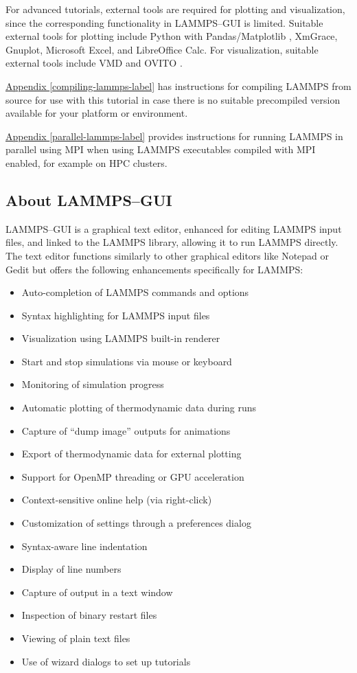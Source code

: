 \documentclass[9pt,tutorial]{livecoms}
\begin{document}
For advanced tutorials, external tools are required for plotting and
visualization, since the corresponding functionality in LAMMPS--GUI is
limited.  Suitable external tools for plotting include Python with
Pandas/Matplotlib \cite{van1995python,hunter2007Matplotlib}, XmGrace,
Gnuplot, Microsoft Excel, and LibreOffice Calc.  For
visualization, suitable external tools include VMD \cite{vmd_home,humphrey1996vmd}
and OVITO \cite{ovito_home,ovito_paper}.

\hyperref[compiling-lammps-label]{Appendix \ref{compiling-lammps-label}}
has instructions for compiling LAMMPS from source for use with this
tutorial in case there is no suitable precompiled version available
for your platform or environment.

\hyperref[parallel-lammps-label]{Appendix \ref{parallel-lammps-label}}
provides instructions for running LAMMPS in parallel using MPI when
using LAMMPS executables compiled with MPI enabled, for example on HPC
clusters.

\subsection{About LAMMPS--GUI}

LAMMPS--GUI is a graphical text editor, enhanced for editing LAMMPS input
files, and linked to the LAMMPS library, allowing it to run LAMMPS
directly.  The text editor functions similarly to other graphical editors
like Notepad or Gedit but offers the following enhancements specifically for LAMMPS:
\begin{itemize}
  \item Auto-completion of LAMMPS commands and options
  \item Syntax highlighting for LAMMPS input files
  \item Visualization using LAMMPS built-in renderer
  \item Start and stop simulations via mouse or keyboard
  \item Monitoring of simulation progress
  \item Automatic plotting of thermodynamic data during runs
  \item Capture of ``dump image'' outputs for animations
  \item Export of thermodynamic data for external plotting
  \item Support for OpenMP threading or GPU acceleration
  \item Context-sensitive online help (via right-click)
  \item Customization of settings through a preferences dialog
  \item Syntax-aware line indentation
  \item Display of line numbers
  \item Capture of output in a text window
  \item Inspection of binary restart files
  \item Viewing of plain text files
  \item Use of wizard dialogs to set up tutorials
\end{itemize}
\end{document}
